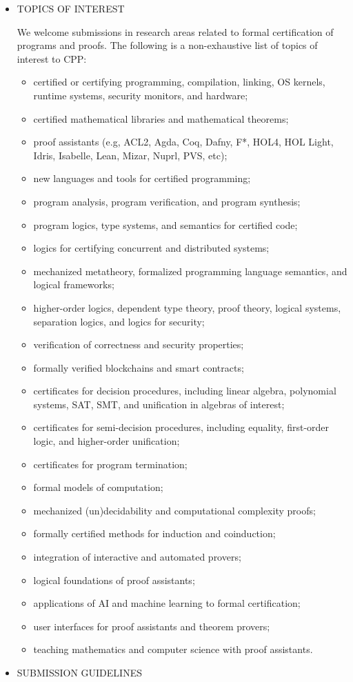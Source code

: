 \documentclass[prodmode,acmtecs]{acmsmall} %
\begin{document}
\begin{itemize}
\item  TOPICS OF INTEREST 
 
  We welcome submissions in research areas related to formal certification of programs and proofs. The following is a non-exhaustive list of topics of interest to CPP: 
 
\begin{itemize}\item certified or certifying programming, compilation, linking, OS kernels, runtime systems, security monitors, and hardware; 
\item certified mathematical libraries and mathematical theorems; 
\item proof assistants (e.g, ACL2, Agda, Coq, Dafny, F*, HOL4, HOL Light, Idris, Isabelle, Lean, Mizar, Nuprl, PVS, etc); 
\item new languages and tools for certified programming; 
\item program analysis, program verification, and program synthesis; 
\item program logics, type systems, and semantics for certified code; 
\item logics for certifying concurrent and distributed systems; 
\item mechanized metatheory, formalized programming language semantics, and logical frameworks; 
\item higher-order logics, dependent type theory, proof theory, logical systems, separation logics, and logics for security; 
\item verification of correctness and security properties; 
\item formally verified blockchains and smart contracts; 
\item certificates for decision procedures, including linear algebra, polynomial systems, SAT, SMT, and unification in algebras of interest; 
\item certificates for semi-decision procedures, including equality, first-order logic, and higher-order unification; 
\item certificates for program termination; 
\item formal models of computation; 
\item mechanized (un)decidability and computational complexity proofs; 
\item formally certified methods for induction and coinduction; 
\item integration of interactive and automated provers; 
\item logical foundations of proof assistants; 
\item applications of AI and machine learning to formal certification; 
\item user interfaces for proof assistants and theorem provers; 
\item teaching mathematics and computer science with proof assistants.
\end{itemize} 
\item  SUBMISSION GUIDELINES 
 

\end{itemize}
\end{document}
